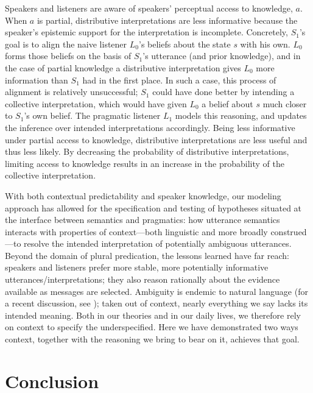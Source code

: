 \documentclass[linguex]{sp}
\begin{document}
Speakers and listeners are aware of speakers' perceptual access to knowledge, $a$. When $a$ is partial, distributive interpretations are less informative because the speaker's epistemic support for the interpretation is incomplete. Concretely, $S_{1}$'s goal is to align the naive listener $L_{0}$'s beliefs about the state $s$ with his own. $L_{0}$ forms those beliefs on the basis of $S_{1}$'s utterance (and prior knowledge), and in the case of partial knowledge a distributive interpretation gives $L_{0}$ more information than $S_{1}$ had in the first place. In such a case, this process of alignment is relatively unsuccessful; $S_{1}$ could have done better by intending a collective interpretation, which would have given $L_{0}$ a belief about $s$ much closer to $S_{1}$'s own belief. The pragmatic listener $L_{1}$ models this reasoning, and updates the inference over intended interpretations accordingly. Being less informative under partial access to knowledge, distributive interpretations are less useful and thus less likely. By decreasing the probability of distributive interpretations, limiting access to knowledge results in an increase in the probability of the collective interpretation.

With both contextual predictability and speaker knowledge, our modeling approach has allowed for the specification and testing of hypotheses situated at the interface between semantics and pragmatics: how utterance semantics interacts with properties of context---both linguistic and more broadly construed---to resolve the intended interpretation of potentially ambiguous utterances. Beyond the domain of plural predication, the lessons learned have far reach: speakers and listeners prefer more stable, more potentially informative utterances/interpretations; they also reason rationally about the evidence available as messages are selected. Ambiguity is endemic to natural language (for a recent discussion, see \citealp{piantadosietal2012}); taken out of context, nearly everything we say lacks its intended meaning. Both in our theories and in our daily lives, we therefore rely on context to specify the underspecified. Here we have demonstrated two ways context, together with the reasoning we bring to bear on it, achieves that goal.


\section{Conclusion}
\end{document}
